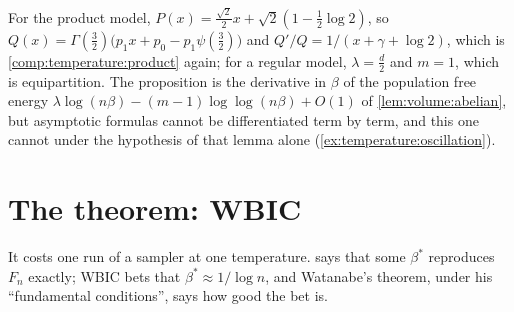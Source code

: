 \begin{refsection}
For the product model, $P(x)=\frac{\sqrt2}2x+\sqrt2(1-\frac12\log2)$, so $Q(x)=\Gamma(\frac32)\bigl(p_1x+p_0-p_1\psi(\frac32)\bigr)$ and $Q'/Q=1/(x+\gamma+\log2)$, which is \cref{comp:temperature:product} again; for a regular model, $\lambda=\frac d2$ and $m=1$, which is equipartition. The proposition is the derivative in $\beta$ of the population free energy $\lambda\log(n\beta)-(m-1)\log\log(n\beta)+O(1)$ of \cref{lem:volume:abelian}, but asymptotic formulas cannot be differentiated term by term, and this one cannot under the hypothesis of that lemma alone (\cref{ex:temperature:oscillation}).

\section{The theorem: WBIC}\label{sec:temperature:wbic}


It costs one run of a sampler at one temperature.  says that some $\beta^*$ reproduces $F_n$ exactly; WBIC bets that $\beta^*\approx1/\log n$, and Watanabe's theorem, under his ``fundamental conditions'', says how good the bet is.


\end{refsection}
